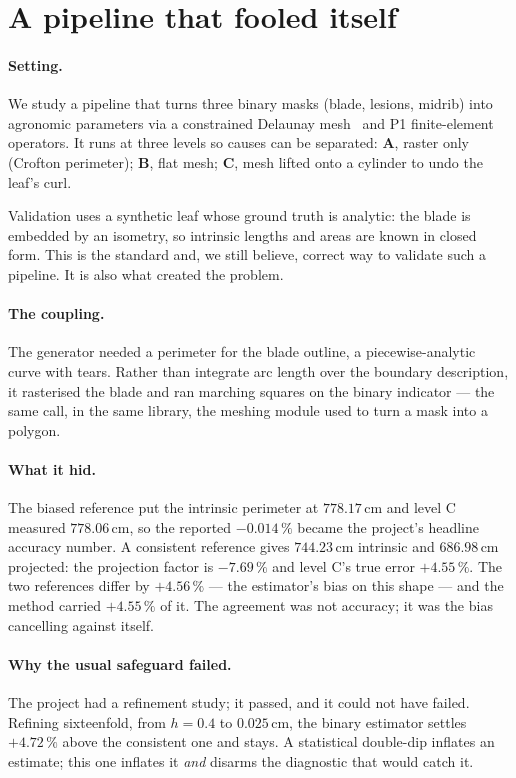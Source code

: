 \documentclass{article}
\newcommand{\pct}[1]{$#1\,\%$}
\begin{document}
\section{A pipeline that fooled itself}
\label{sec:case}

\paragraph{Setting.} We study a pipeline that turns three binary masks (blade, lesions, midrib)
into agronomic parameters via a constrained Delaunay mesh~\citep{shewchuk1996} and P1
finite-element operators. It runs at three levels so causes can be separated: \textbf{A}, raster
only (Crofton perimeter); \textbf{B}, flat mesh; \textbf{C}, mesh lifted onto a cylinder to undo
the leaf's curl.

Validation uses a synthetic leaf whose ground truth is analytic: the blade is embedded by an
isometry, so intrinsic lengths and areas are known in closed form. This is the standard and, we
still believe, correct way to validate such a pipeline. It is also what created the problem.

\paragraph{The coupling.} The generator needed a perimeter for the blade outline, a
piecewise-analytic curve with tears. Rather than integrate arc length over the boundary
description, it rasterised the blade and ran marching squares on the binary indicator --- the same
call, in the same library, the meshing module used to turn a mask into a polygon.

\paragraph{What it hid.} The biased reference put the intrinsic perimeter at $778.17$\,cm and level
C measured $778.06$\,cm, so the reported \pct{-0.014} became the project's headline accuracy number.
A consistent reference gives $744.23$\,cm intrinsic and $686.98$\,cm projected: the projection
factor is \pct{-7.69} and level C's true error \pct{+4.55}. The two references differ by
\pct{+4.56} --- the estimator's bias on this shape --- and the method carried \pct{+4.55} of it. The
agreement was not accuracy; it was the bias cancelling against itself.

\paragraph{Why the usual safeguard failed.} The project had a refinement study; it passed, and it
could not have failed. Refining sixteenfold, from $h=0.4$ to $0.025$\,cm, the binary estimator
settles \pct{+4.72} above the consistent one and stays. A statistical double-dip inflates an
estimate; this one inflates it \emph{and} disarms the diagnostic that would catch it.
\end{document}
